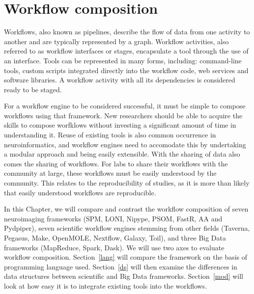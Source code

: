    \section{Workflow composition}\label{workcomp}

        Workflows, also known as pipelines, describe the flow of data from one 
        activity to another and are typically represented by a graph. Workflow activities, also referred to as 
        workflow interfaces or stages, encapsulate a tool through the 
        use of an interface. Tools can be represented in many forms, 
        including: command-line tools, custom scripts integrated 
        directly into the workflow code, web services and software 
        libraries. A workflow activity with all its 
        dependencies is considered ready to be staged.

        For a workflow engine to be considered successful, it must be simple to 
        compose workflows using that framework. New researchers should be able 
        to acquire the skills to compose worfklows without
        investing a significant amount of time in understanding it. Reuse of
        existing tools is also common occurrence in neuroinformatics, and 
        workflow engines need to accomodate this by undertaking a modular 
        approach and being easily extensible. With the sharing of data also 
        comes the sharing of workflows. For labs to share their workflows with
        the community at large, these workflows must be easily understood by the
        community. This relates to the reproducibility of studies, as it is 
        more than likely that easily understood workflows are reproducible. 

        In this Chapter, we will compare and contrast the workflow composition 
        of seven neuroimaging frameworks (SPM, LONI, Nipype, PSOM, FastR, AA and
        Pydpiper), seven scientific workflow engines stemming from other fields
        (Taverna, Pegasus, Make, OpenMOLE, Nextflow, Galaxy, Toil), and three
        Big Data frameworks (MapReduce, Spark, Dask). We will use two axes to
        evaluate workflow composition. Section~\ref{lang} will compare the 
        framework on the basis of programming language used. Section~\ref{ds}
        will then examine the differences in data structures between scientific
        and Big Data frameworks. 
        Section~\ref{mod} will look at how easy it is to integrate existing 
        tools into the workflows.


